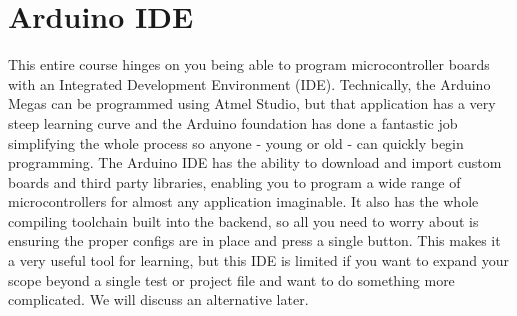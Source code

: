







\section{Arduino IDE}
This entire course hinges on you being able to program microcontroller boards with an Integrated Development Environment (IDE).
Technically, the Arduino Megas can be programmed using Atmel Studio, but that application has a very steep learning curve and the Arduino foundation has done a fantastic job simplifying the whole process so anyone - young or old - can quickly begin programming.
The Arduino IDE has the ability to download and import custom boards and third party libraries, enabling you to program a wide range of microcontrollers for almost any application imaginable.
It also has the whole compiling toolchain built into the backend, so all you need to worry about is ensuring the proper configs are in place and press a single button.
This makes it a very useful tool for learning, but this IDE is limited if you want to expand your scope beyond a single test or project file and want to do something more complicated.
We will discuss an alternative later.

